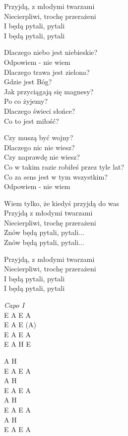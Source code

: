 \begin{text}
    \ifchorded{\hfill\break}
    Przyjdą, z młodymi twarzami\\
    Niecierpliwi, trochę przerażeni\\
    I będą pytali, pytali\\
    I będą pytali, pytali

    Dlaczego niebo jest niebieskie?\\
    Odpowiem - nie wiem\\
    Dlaczego trawa jest zielona?\\
    Gdzie jest Bóg?\\
    Jak przyciągają się magnesy?\\
    Po co żyjemy?\\
    Dlaczego świeci słońce?\\
    Co to jest miłość?

    Czy muszą być wojny?\\
    Dlaczego nic nie wiesz?\\
    Czy naprawdę nie wiesz?\\
    Co w takim razie robiłeś przez tyle lat?\\
    Co za sens jest w tym wszystkim?\\
    Odpowiem - nie wiem

    Wiem tylko, że kiedyś przyjdą do was\\
    Przyjdą z młodymi twarzami\\
    Niecierpliwi, trochę przerażeni\\
    Znów będą pytali, pytali...\\
    Znów będą pytali, pytali...

    Przyjdą, z młodymi twarzami\\
    Niecierpliwi, trochę przerażeni\\
    I będą pytali, pytali\\
    I będą pytali, pytali
\end{text}
\begin{chord}
    \textit{Capo I}\\
    E A E A\\
    E A E (A)\\
    E A E A\\
    E A H E

    A H\\
    E A E A\\
    A H\\
    E A E A\\
    A H\\
    E A E A\\
    A H\\
    E A E A
\end{chord}